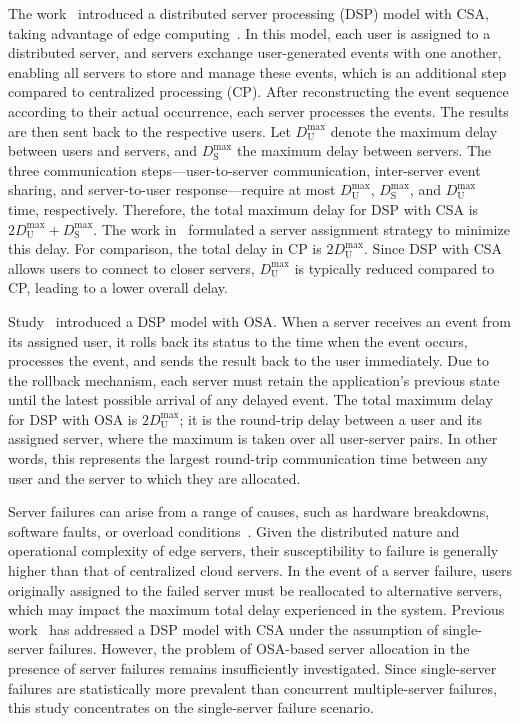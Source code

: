 \documentclass[10pt, letterpaper]{IEEEtran}
\begin{document}
\begin{CJK}{UTF8}{ipxm}
The work~\cite{2Kawabata2017} introduced a distributed server processing (DSP) model with CSA, taking advantage of edge computing~\cite{edge_26,edge_27,edge_28,edge_29}. 
In this model, each user is assigned to a distributed server, and servers exchange user-generated events with one another, enabling all servers to store and manage these events, which is an additional step compared to centralized processing (CP). 
After reconstructing the event sequence according to their actual occurrence, each server processes the events.
The results are then sent back to the respective users. 
Let $D_\mathrm{U}^{\max}$ denote the maximum delay between users and servers, and $D_\mathrm{S}^{\max}$ the maximum delay between servers. 
The three communication steps—user-to-server communication, inter-server event sharing, and server-to-user response—require at most $D_\mathrm{U}^{\max}$, $D_\mathrm{S}^{\max}$, and $D_\mathrm{U}^{\max}$ time, respectively. 
Therefore, the total maximum delay for DSP with CSA is $2D_\mathrm{U}^{\max} + D_\mathrm{S}^{\max}$. 
The work in~\cite{2Kawabata2017} formulated a server assignment strategy to minimize this delay. 
For comparison, the total delay in CP is $2D_\mathrm{U}^{\max}$. 
Since DSP with CSA allows users to connect to closer servers, $D_\mathrm{U}^{\max}$ is typically reduced compared to CP, leading to a lower overall delay.

Study~\cite{OSA_Kawabata_2021,OSA_Kawabata_13_Kawabata2020} introduced a DSP model with OSA.
When a server receives an event from its assigned user, it rolls back its status to the time when the event occurs, processes the event, and sends the result back to the user immediately.
Due to the rollback mechanism, each server must retain the application's previous state until the latest possible arrival of any delayed event.
The total maximum delay for DSP with OSA is $2D_\mathrm{U}^{\max}$;
it is the round-trip delay between a user and its assigned server, where the maximum is taken over all user-server pairs. 
In other words, this represents the largest round-trip communication time between any user and the server to which they are allocated.

Server failures can arise from a range of causes, such as hardware breakdowns, software faults, or overload conditions~\cite{5_9_8_Shi2016}. 
Given the distributed nature and operational complexity of edge servers, their susceptibility to failure is generally higher than that of centralized cloud servers.
In the event of a server failure, users originally assigned to the failed server must be reallocated to alternative servers, which may impact the maximum total delay experienced in the system.
Previous work~\cite{5_9_Masuda2020} has addressed a DSP model with CSA under the assumption of single-server failures.
However, the problem of OSA-based server allocation in the presence of server failures remains insufficiently investigated.
Since single-server failures are statistically more prevalent than concurrent multiple-server failures, this study concentrates on the single-server failure scenario.


\end{CJK}
\end{document}
